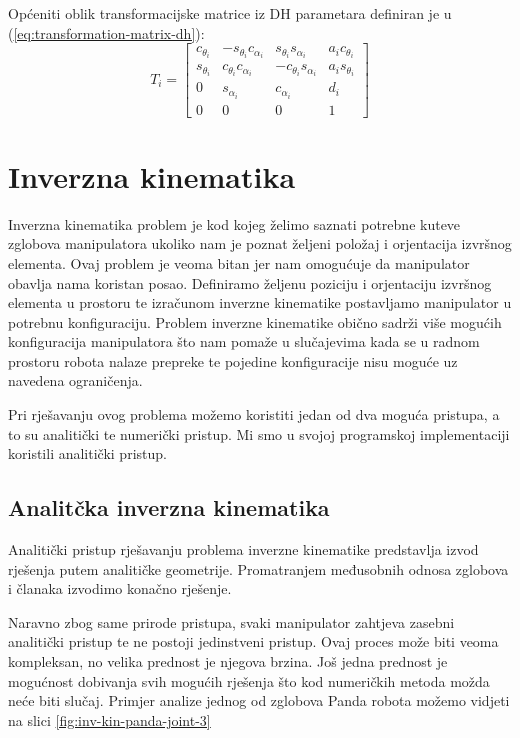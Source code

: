 \documentclass[times, utf8, diplomskirad]{fer}
\begin{document}
Općeniti oblik transformacijske matrice iz DH parametara definiran je u (\ref{eq:transformation-matrix-dh}):
\renewcommand{\arraystretch}{1}
\begin{equation}
T_i=\left[\begin{array}{cccc}
c_{\theta_i} & -s_{\theta_i} c_{\alpha_i} & s_{\theta_i} s_{\alpha_i} & a_i c_{\theta_i} \\
s_{\theta_i} & c_{\theta_i} c_{\alpha_i} & -c_{\theta_i} s_{\alpha_i} & a_i s_{\theta_i} \\
0 & s_{\alpha_i} & c_{\alpha_i} & d_i \\
0 & 0 & 0 & 1
\end{array}\right]
    \label{eq:transformation-matrix-dh}
\end{equation}

\newpage
\section{Inverzna kinematika}
Inverzna kinematika problem je kod kojeg želimo saznati potrebne kuteve zglobova manipulatora ukoliko nam je poznat željeni položaj i orjentacija izvršnog elementa.
Ovaj problem je veoma bitan jer nam omogućuje da manipulator obavlja nama koristan posao.
Definiramo željenu poziciju i orjentaciju izvršnog elementa u prostoru te izračunom inverzne kinematike postavljamo manipulator u potrebnu konfiguraciju.
Problem inverzne kinematike obično sadrži više mogućih konfiguracija manipulatora što nam pomaže u slučajevima kada se u radnom prostoru robota nalaze prepreke te pojedine konfiguracije nisu moguće uz navedena ograničenja.

Pri rješavanju ovog problema možemo koristiti jedan od dva moguća pristupa, a to su analitički te numerički pristup.
Mi smo u svojoj programskoj implementaciji koristili analitički pristup.

\subsection{Analitčka inverzna kinematika}
Analitički pristup rješavanju problema inverzne kinematike predstavlja izvod rješenja putem analitičke geometrije.
Promatranjem međusobnih odnosa zglobova i članaka izvodimo konačno rješenje.

Naravno zbog same prirode pristupa, svaki manipulator zahtjeva zasebni analitički pristup te ne postoji jedinstveni pristup.
Ovaj proces može biti veoma kompleksan, no velika prednost je njegova brzina.
Još jedna prednost je mogućnost dobivanja svih mogućih rješenja što kod numeričkih metoda možda neće biti slučaj.
Primjer analize jednog od zglobova Panda robota možemo vidjeti na slici \ref{fig:inv-kin-panda-joint-3}
\end{document}
